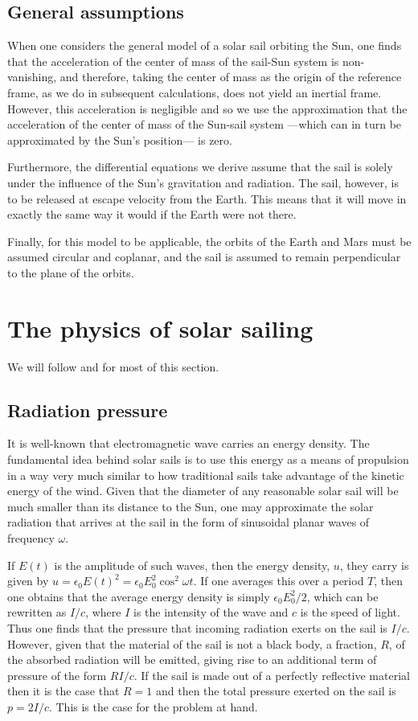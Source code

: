 \documentclass[twocolumn,12pt,a4paper]{article}
\numberwithin{equation}{section}
\begin{document}
\subsection{General assumptions}
When one considers the general model of a solar sail orbiting the Sun, one finds that the acceleration of the center of mass of the sail-Sun system is non-vanishing, and therefore, taking the center of mass as the origin of the reference frame, as we do in subsequent calculations, does not yield an inertial frame. However, this acceleration is negligible and so we use the approximation that the acceleration of the center of mass of the Sun-sail system ---which can in turn be approximated by the Sun's position--- is zero.

Furthermore, the differential equations we derive assume that the sail is solely under the influence of the Sun's gravitation and radiation. The sail, however, is to be released at escape velocity from the Earth. This means that it will move in exactly the same way it would if the Earth were not there. 

Finally, for this model to be applicable, the orbits of the Earth and Mars must be assumed circular and coplanar, and the sail is assumed to remain perpendicular to the plane of the orbits.

\section{The physics of solar sailing}
We will follow \cite{tsu} and \cite[Ch. 4]{mcinnes} for most of this section.
\subsection{Radiation pressure}
It is well-known that electromagnetic wave carries an energy density. The fundamental idea behind solar sails is to use this energy as a means of propulsion in a way very much similar to how traditional sails take advantage of the kinetic energy of the wind. Given that the diameter of any reasonable solar sail will be much smaller than its distance to the Sun, one may approximate the solar radiation that arrives at the sail in the form of sinusoidal planar waves of frequency \( \omega \).

If \( E(t) \) is the amplitude of such waves, then the energy density, \( u \), they carry is given by \( u = \epsilon_0 E(t)^2 = \epsilon_0 E_0^2 \cos^2{\omega t} \). If one averages this over a period \( T \), then one obtains that the average energy density is simply \( \epsilon_0 E_0^2 /2 \), which can be rewritten as \( I/c \), where \( I \) is the intensity of the wave and \( c \) is the speed of light. Thus one finds that the pressure that incoming radiation exerts on the sail is \( I/c \). However, given that the material of the sail is not a black body, a fraction, \( R \), of the absorbed radiation will be emitted, giving rise to an additional term of pressure of the form \( RI/c \). If the sail is made out of a perfectly reflective material then it is the case that \( R = 1 \) and then the total pressure exerted on the sail is \( p = 2I/c \). This is the case for the problem at hand.
\end{document}
